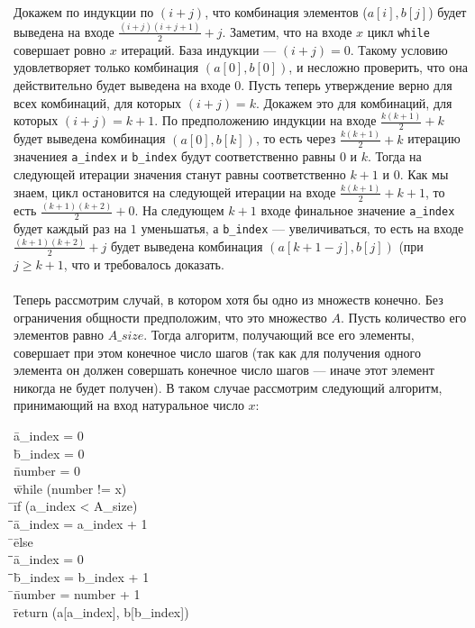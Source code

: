 \documentclass[a4paper,12pt]{article}
\newcommand{\tab}{\quad\=}
\newenvironment{programm}{
    \ttfamily
    \begin{tabbing}
    }
    {
    \end{tabbing}
}
\begin{document}
	
	Докажем по индукции по $(i+j)$, что комбинация элементов ($a[i], b[j]$) будет выведена на входе $\frac{(i+j)(i+j+1)}2+j$. Заметим, что на входе $x$ цикл \texttt{while} совершает ровно $x$ итераций. База индукции --- $(i+j)=0$. Такому условию удовлетворяет только комбинация $(a[0], b[0])$, и несложно проверить, что она действительно будет выведена на входе $0$. Пусть теперь утверждение верно для всех комбинаций, для которых $(i+j)=k$. Докажем это для комбинаций, для которых $(i+j)=k+1$. По предположению индукции на входе $\frac{k(k+1)}2+k$ будет выведена комбинация $(a[0], b[k])$, то есть через $\frac{k(k+1)}2+k$ итерацию значениея \texttt{a\_index} и \texttt{b\_index} будут соответственно равны $0$ и $k$. Тогда на следующей итерации значения станут равны соответственно $k+1$ и $0$. Как мы знаем, цикл остановится на следующей итерации на входе $\frac{k(k+1)}2+k+1$, то есть $\frac{(k+1)(k+2)}2+0$. На следующем $k+1$ входе финальное значение \texttt{a\_index} будет каждый раз на $1$ уменьшатья, а \texttt{b\_index} --- увеличиваться, то есть на входе $\frac{(k+1)(k+2)}2+j$ будет выведена комбинация $(a[k+1-j], b[j])$ (при $j\geqslant k+1$, что и требовалось доказать.\\\\
	Теперь рассмотрим случай, в котором хотя бы одно из множеств конечно. Без ограничения общности предположим, что это множество $A$. Пусть количество его элементов равно $A\_size$. Тогда алгоритм, получающий все его элементы, совершает при этом конечное число шагов (так как для получения одного элемента он должен совершать конечное число шагов --- иначе этот элемент никогда не будет получен). В таком случае рассмотрим следующий алгоритм, принимающий на вход натуральное число $x$:
	\begin{programm}
    \tab a\_index = 0\\
    \tab b\_index = 0\\
    \tab number = 0\\
    \tab while (number != x)\\
    \tab \tab if (a\_index < A\_size)\\
    \tab \tab \tab a\_index = a\_index + 1\\
    \tab \tab else\\
    \tab \tab \tab a\_index = 0\\
    \tab \tab \tab b\_index = b\_index + 1\\
    \tab \tab number = number + 1\\
    \tab return (a[a\_index], b[b\_index])\\
	\end{programm}
	
\end{document}

